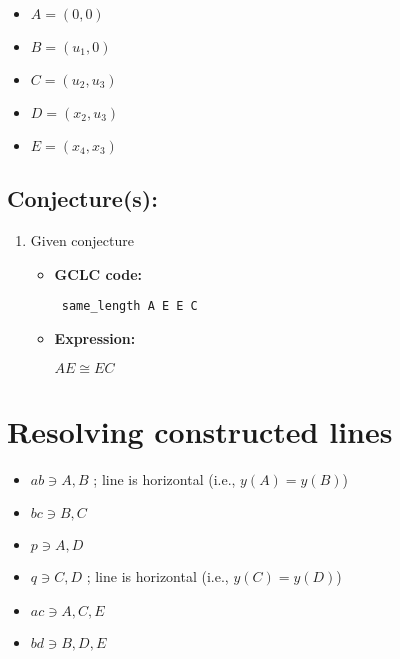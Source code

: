 \documentclass[a4paper]{article}
\begin{document}
\begin{itemize}

\item $A = (0, 0)$

\item $B = (u_{1}, 0)$

\item $C = (u_{2}, u_{3})$

\item $D = (x_{2}, u_{3})$

\item $E = (x_{4}, x_{3})$

\end{itemize}





\subsection*{Conjecture(s):}

\begin{enumerate}

\item Given conjecture

\begin{itemize}

\item \textbf{GCLC code:}


\begin{verbatim}
 same_length A E E C 
\end{verbatim}

\end{itemize}

\begin{itemize}

\item \textbf{Expression:}



$AE\cong EC $\end{itemize}

\end{enumerate}

\hspace*{4.1mm}





\section{Resolving constructed lines}

\begin{itemize}

\item $ab \ni A, B$ ; line is horizontal (i.e., $y(A) = y(B)$)\item $bc \ni B, C$ \item $p \ni A, D$ \item $q \ni C, D$ ; line is horizontal (i.e., $y(C) = y(D)$)\item $ac \ni A, C, E$ \item $bd \ni B, D, E$ \end{itemize}
\end{document}
